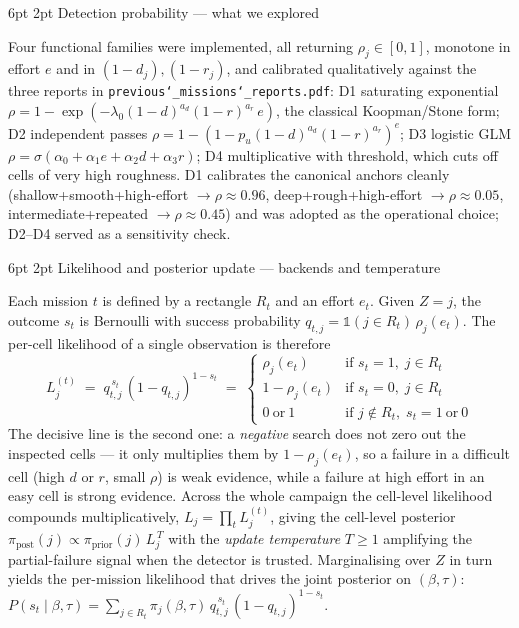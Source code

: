 \documentclass[11pt,a4paper]{article}
\makeatletter
\renewcommand\section{\@startsection{section}{1}{\z@}%
                                    {6pt \@plus 1pt \@minus 1pt}%
                                    {2pt}%
                                    {\normalfont\normalsize\bfseries}}
\makeatother
\begin{document}
\section{Detection probability --- what we explored}

Four functional families were implemented, all returning $\rho_j \in [0,1]$,
monotone in effort $e$ and in $(1-d_j),(1-r_j)$, and calibrated qualitatively
against the three reports in \texttt{previous\char`_missions\char`_reports.pdf}:
D1 saturating exponential
$\rho = 1 - \exp(-\lambda_0(1-d)^{a_d}(1-r)^{a_r}\,e)$,
the classical Koopman/Stone form;
D2 independent passes
$\rho = 1 - (1 - p_u(1-d)^{a_d}(1-r)^{a_r})^e$;
D3 logistic GLM
$\rho = \sigma(\alpha_0 + \alpha_1 e + \alpha_2 d + \alpha_3 r)$;
D4 multiplicative with threshold, which cuts off cells of very high
roughness. D1 calibrates the canonical anchors cleanly
(shallow+smooth+high-effort $\to \rho \approx 0.96$, deep+rough+high-effort
$\to \rho \approx 0.05$, intermediate+repeated $\to \rho \approx 0.45$) and was
adopted as the operational choice; D2--D4 served as a sensitivity check.

\section{Likelihood and posterior update --- backends and temperature}

Each mission $t$ is defined by a rectangle $R_t$ and an effort $e_t$. Given
$Z = j$, the outcome $s_t$ is Bernoulli with success probability
$q_{t,j} = \mathbb{1}(j \in R_t)\,\rho_j(e_t)$. The per-cell likelihood
of a single observation is therefore
\[
  L_j^{(t)} \;=\; q_{t,j}^{\,s_t}\,(1 - q_{t,j})^{1 - s_t}
            \;=\;
            \begin{cases}
              \rho_j(e_t) & \text{if } s_t = 1,\; j \in R_t \\
              1 - \rho_j(e_t) & \text{if } s_t = 0,\; j \in R_t \\
              0\ \text{or}\ 1 & \text{if } j \notin R_t,\; s_t = 1\ \text{or}\ 0
            \end{cases}
\]
The decisive line is the second one: a \emph{negative} search does not zero out
the inspected cells --- it only multiplies them by $1 - \rho_j(e_t)$, so a
failure in a difficult cell (high $d$ or $r$, small $\rho$) is weak evidence,
while a failure at high effort in an easy cell is strong evidence. Across the
whole campaign the cell-level likelihood compounds multiplicatively,
$L_j = \prod_t L_j^{(t)}$, giving the cell-level posterior
$\pi_{\mathrm{post}}(j) \propto \pi_{\mathrm{prior}}(j)\,L_j^{\,T}$ with the
\emph{update temperature} $T \ge 1$ amplifying the partial-failure signal when
the detector is trusted. Marginalising over $Z$ in turn yields the per-mission
likelihood that drives the joint posterior on $(\beta, \tau)$:
$
  P(s_t \mid \beta, \tau) = \sum_{j \in R_t} \pi_j(\beta, \tau)\,
  q_{t,j}^{\,s_t}\,(1 - q_{t,j})^{1 - s_t}.
$
\end{document}
